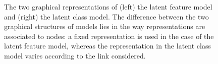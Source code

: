 \begin{figure}[t]
	\centering
	\vspace{1cm}
	\scalebox{0.88}{
	}
	\endminipage
	\scalebox{0.88}{
		}
	\endminipage
	\caption{The two graphical representations of (left) the latent feature model and (right) the latent class model. The difference between the two graphical structures of  models lies in the way representations are associated to nodes: a fixed representation is used in the case of the latent feature model, whereas the representation in the latent class model varies according to the link considered.}
	\label{fig:mmm}
\end{figure}
